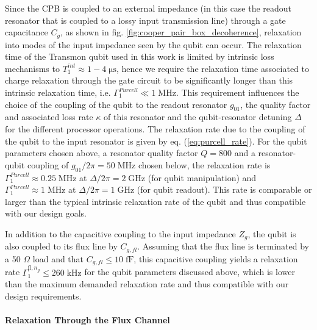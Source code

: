 Since the CPB is coupled to an external impedance (in this case the readout resonator that is coupled to a lossy input transmission line) through a gate capacitance $C_g$, as shown in fig. \ref{fig:cooper_pair_box_decoherence}, relaxation into modes of the input impedance seen by the qubit can occur. The relaxation time of the Transmon qubit used in this work is limited by intrinsic loss mechanisms \citep{simmonds_decoherence_2004,martinis_decoherence_2005} to $T_1^{int}\approx 1-4 \; \mathrm{\mu s}$, hence we require the relaxation time associated to charge relaxation through the gate circuit to be significantly longer than this intrinsic relaxation time, i.e. $\Gamma_1^{Purcell}\ll 1\;\mathrm{MHz}$. This requirement influences the choice of the coupling of the qubit to the readout resonator $g_{01}$, the quality factor and associated loss rate $\kappa$ of this resonator and the qubit-resonator detuning $\Delta$ for the different processor operations. The relaxation rate due to the coupling of the qubit to the input resonator is given by eq. (\ref{eq:purcell_rate}). For the qubit parameters chosen above, a resonator quality factor $Q=800$ and a resonator-qubit coupling of $g_{01}/2\pi=50\;\mathrm{MHz}$ chosen below, the relaxation rate is $\Gamma_1^{Purcell}\approx 0.25\;\mathrm{MHz}$ at $\Delta/2\pi = 2\;\mathrm{GHz}$ (for qubit manipulation) and $\Gamma_1^{Purcell}\approx 1\;\mathrm{MHz}$ at $\Delta/2\pi = 1\;\mathrm{GHz}$ (for qubit readout). This rate is comparable or larger than the typical intrinsic relaxation rate of the qubit and thus compatible with our design goals.

\smallskip

In addition to the capacitive coupling to the input impedance $Z_g$, the qubit is also coupled to its flux line by $C_{g,fl}$. Assuming that the flux line is terminated by a 50 $\Omega$ load and that $C_{g,fl}\le 10\;\mathrm{fF}$, this capacitive coupling yields a relaxation rate $\Gamma_1^{\mathrm{fl},n_g}\le 260 \;\mathrm{kHz}$ for the qubit parameters discussed above, which is lower than the maximum demanded relaxation rate and thus compatible with our design requirements.
 
\paragraph{Relaxation Through the Flux Channel} \label{section:relaxation_through_charge}

